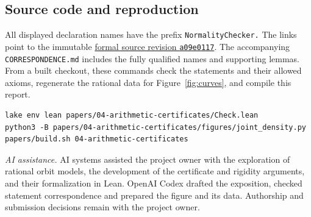 \documentclass[11pt]{article}
\begin{document}
\noindent\begin{minipage}{\linewidth}
\subsection*{Source code and reproduction}
All displayed declaration names have the prefix \texttt{NormalityChecker.}
The links point to the immutable \href{https://github.com/eldernos/MathematicsResearch/tree/a09e011720bc74396a27f4cb3ce2d8a5b3ce5035}{formal source revision \texttt{a09e0117}}. The accompanying \nolinkurl{CORRESPONDENCE.md} includes the fully qualified names and supporting lemmas. From a built checkout, these commands check the statements and their allowed axioms, regenerate the rational data for Figure~\ref{fig:curves}, and compile this report.
\begin{small}
\begin{verbatim}
lake env lean papers/04-arithmetic-certificates/Check.lean
python3 -B papers/04-arithmetic-certificates/figures/joint_density.py
papers/build.sh 04-arithmetic-certificates
\end{verbatim}
\end{small}
\end{minipage}

\smallskip
\noindent\emph{AI assistance.} AI systems assisted the project owner with the exploration of rational orbit models, the development of the certificate and rigidity arguments, and their formalization in Lean. OpenAI Codex drafted the exposition, checked statement correspondence and prepared the figure and its data. Authorship and submission decisions remain with the project owner.

\begingroup\small


\endgroup
\end{document}
